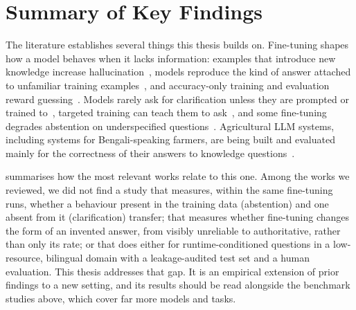 

\section{Summary of Key Findings}
\label{sec:lit-summary}

The literature establishes several things this thesis builds on. Fine-tuning shapes how a model behaves when it lacks information: examples that introduce new knowledge increase hallucination~\cite{gekhman2024finetuning}, models reproduce the kind of answer attached to unfamiliar training examples~\cite{kang2025unfamiliar}, and accuracy-only training and evaluation reward guessing~\cite{kalai2025why}. Models rarely ask for clarification unless they are prompted or trained to~\cite{kuhn2022clam,li2025questbench}, targeted training can teach them to ask~\cite{andukuri2024stargate,zhang2024modeling,wu2025clarifycoder}, and some fine-tuning degrades abstention on underspecified questions~\cite{kirichenko2025abstentionbench,fan2025missing}. Agricultural LLM systems, including systems for Bengali-speaking farmers, are being built and evaluated mainly for the correctness of their answers to knowledge questions~\cite{singh2024farmerchat,krishokbondhu2025,krishokchat2026}.

 summarises how the most relevant works relate to this one. Among the works we reviewed, we did not find a study that measures, within the same fine-tuning runs, whether a behaviour present in the training data (abstention) and one absent from it (clarification) transfer; that measures whether fine-tuning changes the form of an invented answer, from visibly unreliable to authoritative, rather than only its rate; or that does either for runtime-conditioned questions in a low-resource, bilingual domain with a leakage-audited test set and a human evaluation. This thesis addresses that gap. It is an empirical extension of prior findings to a new setting, and its results should be read alongside the benchmark studies above, which cover far more models and tasks.
